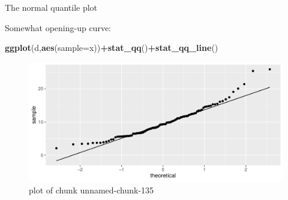 \documentclass[ignorenonframetext,]{beamer}
\newenvironment{Shaded}{\begin{snugshade}}{\end{snugshade}}
\newcommand{\DataTypeTok}[1]{\textcolor[rgb]{0.13,0.29,0.53}{#1}}
\newcommand{\KeywordTok}[1]{\textcolor[rgb]{0.13,0.29,0.53}{\textbf{#1}}}
\newcommand{\NormalTok}[1]{#1}
\newcommand{\OperatorTok}[1]{\textcolor[rgb]{0.81,0.36,0.00}{\textbf{#1}}}
\begin{document}
\begin{frame}[fragile]{The normal quantile plot}
\protect\hypertarget{the-normal-quantile-plot-3}{}

Somewhat opening-up curve:

\begin{Shaded}
\begin{Highlighting}[]
\KeywordTok{ggplot}\NormalTok{(d,}\KeywordTok{aes}\NormalTok{(}\DataTypeTok{sample=}\NormalTok{x))}\OperatorTok{+}\KeywordTok{stat_qq}\NormalTok{()}\OperatorTok{+}\KeywordTok{stat_qq_line}\NormalTok{()}
\end{Highlighting}
\end{Shaded}

\begin{figure}
\centering
\includegraphics{figure/unnamed-chunk-135-1.pdf}
\caption{plot of chunk unnamed-chunk-135}
\end{figure}

\end{frame}
\end{document}
